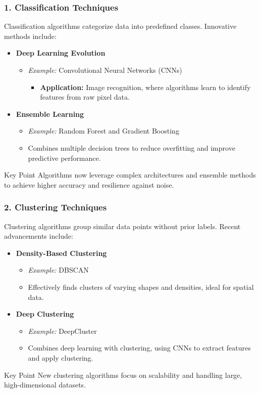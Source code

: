 \documentclass{beamer}
\begin{document}
\begin{frame}[fragile]
    \frametitle{1. Classification Techniques}
    Classification algorithms categorize data into predefined classes. Innovative methods include:
    \begin{itemize}
        \item \textbf{Deep Learning Evolution}
        \begin{itemize}
            \item \textit{Example:} Convolutional Neural Networks (CNNs)
            \begin{itemize}
                \item \textbf{Application:} Image recognition, where algorithms learn to identify features from raw pixel data.
            \end{itemize}
        \end{itemize}
        \item \textbf{Ensemble Learning}
        \begin{itemize}
            \item \textit{Example:} Random Forest and Gradient Boosting
            \item Combines multiple decision trees to reduce overfitting and improve predictive performance.
        \end{itemize}
    \end{itemize}
    \begin{block}{Key Point}
        Algorithms now leverage complex architectures and ensemble methods to achieve higher accuracy and resilience against noise.
    \end{block}
\end{frame}

\begin{frame}[fragile]
    \frametitle{2. Clustering Techniques}
    Clustering algorithms group similar data points without prior labels. Recent advancements include:
    \begin{itemize}
        \item \textbf{Density-Based Clustering}
        \begin{itemize}
            \item \textit{Example:} DBSCAN
            \item Effectively finds clusters of varying shapes and densities, ideal for spatial data.
        \end{itemize}
        \item \textbf{Deep Clustering}
        \begin{itemize}
            \item \textit{Example:} DeepCluster
            \item Combines deep learning with clustering, using CNNs to extract features and apply clustering.
        \end{itemize}
    \end{itemize}
    \begin{block}{Key Point}
        New clustering algorithms focus on scalability and handling large, high-dimensional datasets.
    \end{block}
\end{frame}
\end{document}
